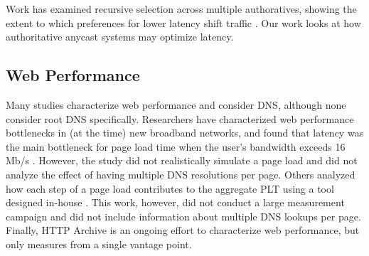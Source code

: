 \documentclass[sigconf,letterpaper,nonacm,10pt,anonymous]{acmart}
\begin{document}
Work has examined recursive selection across multiple authoratives,
showing the extent to which preferences for lower latency shift traffic
\cite{Mueller17b}. Our work looks at how authoritative anycast systems
may optimize latency.

\subsection{Web Performance}\label{web-performance}

\label{sec:related_web_performance}

Many studies characterize web performance and consider DNS, although
none consider root DNS specifically. Researchers have characterized web
performance bottlenecks in (at the time) new broadband networks, and
found that latency was the main bottleneck for page load time when the
user's bandwidth exceeds 16 Mb/s \cite{sundaresan2013web}. However, the
study did not realistically simulate a page load and did not analyze the
effect of having multiple DNS resolutions per page. Others analyzed how
each step of a page load contributes to the aggregate PLT using a tool
designed in-house \cite{asrese2016wepr}. This work, however, did not
conduct a large measurement campaign and did not include information
about multiple DNS lookups per page. Finally, HTTP Archive
\cite{http_archive} is an ongoing effort to characterize web
performance, but only measures from a single vantage point.
\end{document}
